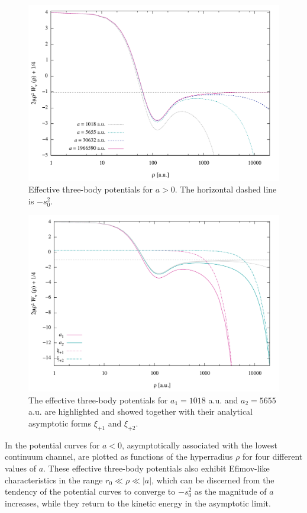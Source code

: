 \begin{figure}
	\includegraphics[width=\linewidth]{finite_positive_a.pdf}
	\caption{Effective three-body potentials for $a>0$. The horizontal dashed line is $-s_0^2$.}
	\label{fig:res_5}
\end{figure}

\begin{figure}
	\includegraphics[width=\linewidth]{finite_conv.pdf}
	\caption{The effective three-body potentials for $a_1=1018$ a.u. and $a_2=5655$ a.u. are highlighted and showed together with their analytical asymptotic forms $\xi_{+1}$ and $\xi_{+2}$.}
	\label{fig:finite_conv}
\end{figure}

In  the potential curves for $a<0$, asymptotically associated with the lowest continuum channel, are plotted as functions of the hyperradius $\rho$ for four different values of $a$. These effective three-body potentials also exhibit Efimov-like characteristics in the range $r_0 \ll \rho \ll |a|$, which can be discerned from the tendency of the potential curves to converge to $-s_0^2$ as the magnitude of $a$ increases, while they return to the kinetic energy in the asymptotic limit.

